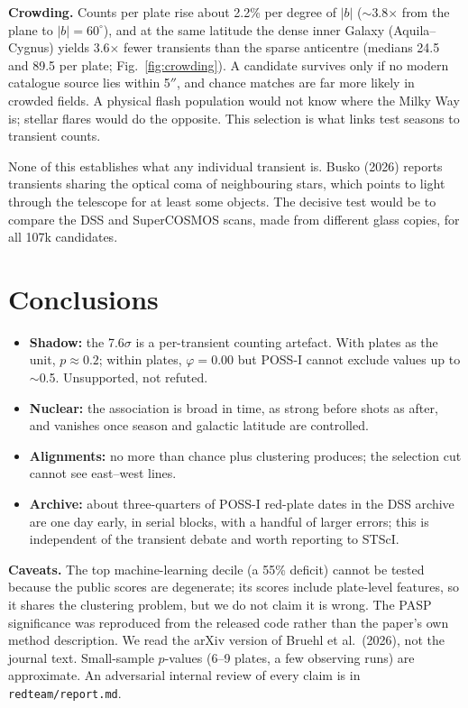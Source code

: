 \documentclass[11pt,a4paper]{article}
\begin{document}
\textbf{Crowding.} Counts per plate rise about 2.2\% per degree of $|b|$ ($\sim$3.8$\times$ from the plane to
$|b|=60^\circ$), and at the same latitude the dense inner Galaxy (Aquila--Cygnus) yields 3.6$\times$ fewer transients
than the sparse anticentre (medians 24.5 and 89.5 per plate; Fig.~\ref{fig:crowding}). A candidate survives only if no
modern catalogue source lies within 5$''$, and chance matches are far more likely in crowded fields. A physical flash
population would not know where the Milky Way is; stellar flares would do the opposite. This selection is what links
test seasons to transient counts.

None of this establishes what any individual transient is. Busko (2026) reports transients sharing the optical coma of
neighbouring stars, which points to light through the telescope for at least some objects. The decisive test would be
to compare the DSS and SuperCOSMOS scans, made from different glass copies, for all 107k candidates.

\section{Conclusions}

\begin{itemize}\itemsep0pt
\item \textbf{Shadow:} the 7.6$\sigma$ is a per-transient counting artefact. With plates as the unit, $p\approx0.2$; within
plates, $\varphi=0.00$ but POSS-I cannot exclude values up to $\sim$0.5. Unsupported, not refuted.
\item \textbf{Nuclear:} the association is broad in time, as strong before shots as after, and vanishes once season and
galactic latitude are controlled.
\item \textbf{Alignments:} no more than chance plus clustering produces; the selection cut cannot see east--west lines.
\item \textbf{Archive:} about three-quarters of POSS-I red-plate dates in the DSS archive are one day early, in serial blocks,
with a handful of larger errors; this is independent of the transient debate and worth reporting to STScI.
\end{itemize}

\textbf{Caveats.} The top machine-learning decile (a 55\% deficit) cannot be tested because the public scores are
degenerate; its scores include plate-level features, so it shares the clustering problem, but we do not claim it is wrong.
The PASP significance was reproduced from the released code rather than the paper's own method description. We read the
arXiv version of Bruehl et al.\ (2026), not the journal text. Small-sample $p$-values (6--9 plates, a few observing
runs) are approximate. An adversarial internal review of every claim is in \texttt{redteam/report.md}.
\end{document}

